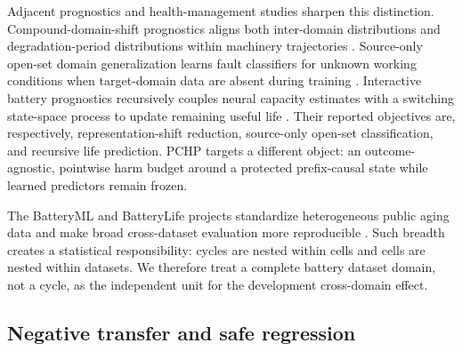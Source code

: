 \documentclass[preprint,12pt]{elsarticle}
\begin{document}
Adjacent prognostics and health-management studies sharpen this distinction. Compound-domain-shift prognostics aligns both inter-domain distributions and degradation-period distributions within machinery trajectories \citep{ding2023compound}. Source-only open-set domain generalization learns fault classifiers for unknown working conditions when target-domain data are absent during training \citep{song2026regroupment}. Interactive battery prognostics recursively couples neural capacity estimates with a switching state-space process to update remaining useful life \citep{duan2025interactive}. Their reported objectives are, respectively, representation-shift reduction, source-only open-set classification, and recursive life prediction. PCHP targets a different object: an outcome-agnostic, pointwise harm budget around a protected prefix-causal state while learned predictors remain frozen.

The BatteryML and BatteryLife projects standardize heterogeneous public aging data and make broad cross-dataset evaluation more reproducible \citep{zhang2024batteryml,tan2025batterylife}. Such breadth creates a statistical responsibility: cycles are nested within cells and cells are nested within datasets. We therefore treat a complete battery dataset domain, not a cycle, as the independent unit for the development cross-domain effect.

\subsection{Negative transfer and safe regression}
\end{document}
